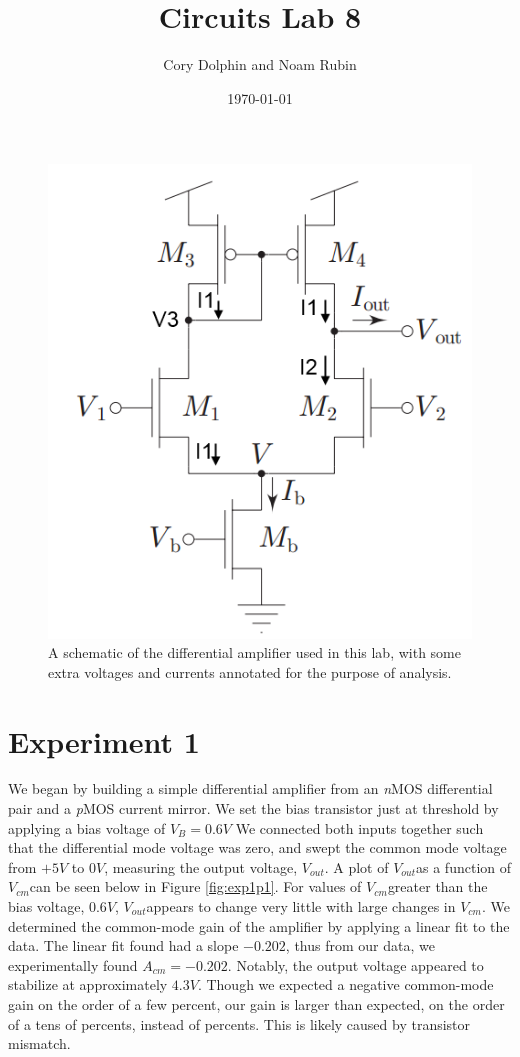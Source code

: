 \documentclass{article}
\title{Circuits Lab 8}
\author{Cory Dolphin and Noam Rubin}
\date{\today}
\newcommand{\Vout}{{$V_{out}$}}
\newcommand{\Vcm}{{$V_{cm}$}}
\newcommand{\nMOS}{{\textit{n}MOS }}
\newcommand{\pMOS}{{\textit{p}MOS }}
\begin{document}
\maketitle

\begin{figure}[H]
\centering
\includegraphics[width=0.6\linewidth]{../Figures/Lab8Schematic}
\caption{A schematic of the differential amplifier used in this lab, with some extra voltages and currents annotated for the purpose of analysis.}
\label{fig:lab8schem}
\end{figure}


\section*{Experiment 1}
We began by building a simple differential amplifier from an \nMOS differential pair and a \pMOS current mirror. We set the bias transistor just at threshold by applying a bias voltage of $V_B=0.6V$ We connected both inputs together such that the differential mode voltage was zero, and swept the common mode voltage from $+5V$ to $0V$, measuring the output voltage, \Vout. 
A plot of \Vout as a function of \Vcm can be seen below in Figure \ref{fig:exp1p1}. For values of \Vcm greater than the bias voltage, $0.6V$, \Vout appears to change very little with large changes in \Vcm.  We determined the common-mode gain of the amplifier by applying a linear fit to the data. The linear fit found had a slope $-0.202$, thus from our data, we experimentally found $A_{cm} = -0.202$. Notably, the output voltage appeared to stabilize at approximately $4.3V$.
Though we expected a negative common-mode gain on the order of a few percent, our gain is larger than expected, on the order of a tens of percents, instead of percents. This is likely caused by transistor mismatch.
\end{document}
